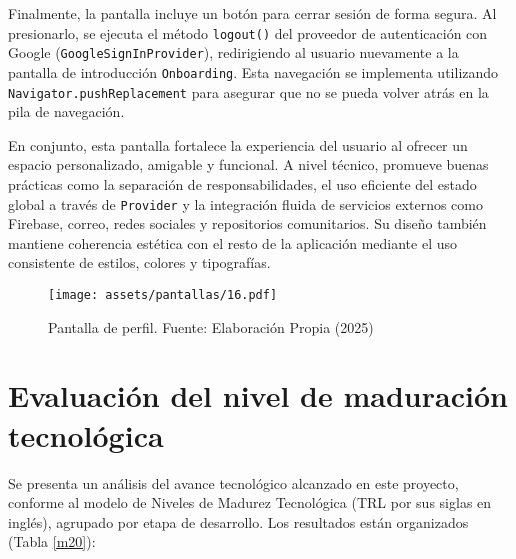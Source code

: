 Finalmente, la pantalla incluye un botón para cerrar sesión de forma segura. Al presionarlo, se ejecuta el método \texttt{logout()} del proveedor de autenticación con Google (\texttt{GoogleSignInProvider}), redirigiendo al usuario nuevamente a la pantalla de introducción \texttt{Onboarding}. Esta navegación se implementa utilizando \texttt{Navigator.pushReplacement} para asegurar que no se pueda volver atrás en la pila de navegación.

En conjunto, esta pantalla fortalece la experiencia del usuario al ofrecer un espacio personalizado, amigable y funcional. A nivel técnico, promueve buenas prácticas como la separación de responsabilidades, el uso eficiente del estado global a través de \texttt{Provider} y la integración fluida de servicios externos como Firebase, correo, redes sociales y repositorios comunitarios. Su diseño también mantiene coherencia estética con el resto de la aplicación mediante el uso consistente de estilos, colores y tipografías.



\begin{figure}[h!]
\centering
  \texttt{[image: assets/pantallas/16.pdf]}
  \caption{Pantalla de perfil. Fuente: Elaboración Propia (2025)}
  \label{pantallas16}
\end{figure}

 
\newpage
\section{Evaluación del nivel de maduración tecnológica}
Se presenta un análisis del avance tecnológico alcanzado en este proyecto, conforme al modelo de Niveles de Madurez Tecnológica (TRL por sus siglas en inglés), agrupado por etapa de desarrollo. Los resultados están organizados (Tabla \ref{m20}):



